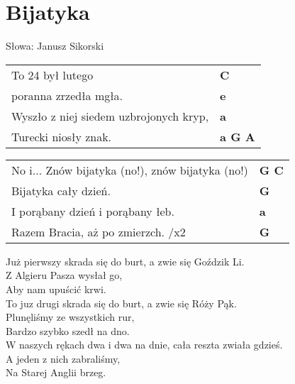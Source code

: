 \section{Bijatyka}

Słowa: Janusz Sikorski

\vspace{2em}
\begin{tabular}{@{}p{8cm}@{}l@{}}
To 24 był lutego & \bfseries C\\
poranna zrzedła mgła. & \bfseries e\\
Wyszło z niej siedem uzbrojonych kryp, & \bfseries a\\
Turecki niosły znak. & \bfseries a G A\\
\end{tabular}

\vspace{1em}
\begin{tabular}{@{}p{8cm}@{}l@{}}
No i... Znów bijatyka (no!), znów bijatyka (no!) & \bfseries G C\\
Bijatyka cały dzień. & \bfseries G\\
I porąbany dzień i porąbany łeb. & \bfseries a\\
Razem Bracia, aż po zmierzch. /x2 & \bfseries G \\
\end{tabular}

\vspace{1em}
Już pierwszy skrada się do burt, a zwie się Goździk Li. \\
Z Algieru Pasza wysłał go, \\
Aby nam upuścić krwi. \\

To juz drugi skrada się do burt, a zwie się Róży Pąk. \\
Plunęliśmy ze wszystkich rur, \\
Bardzo szybko szedł na dno. \\

W naszych rękach dwa i dwa na dnie, cała reszta zwiała gdzieś. \\
A jeden z nich zabraliśmy, \\
Na Starej Anglii brzeg.